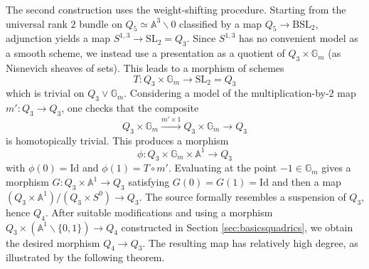 \documentclass[11pt,leqno]{article}
\newcommand{\A}{{\mathbb A}}
\renewcommand{\1}{{\rm 1\hspace*{-0.4ex}%
\rule{0.1ex}{1.52ex}\hspace*{0.2ex}}}
\newcommand{\gm}{{{\mathbb G}_{m}}}
\newcommand{\<}[1]{{\langle}#1 {\rangle}}
\theoremstyle{plain}
\theoremstyle{definition}
\theoremstyle{remark}
\numberwithin{equation}{section}
\begin{document}
The second construction uses the weight-shifting procedure. Starting from the universal rank $2$ bundle on $Q_5\simeq \A^3\smallsetminus{0}$ classified by a map $Q_5\to \mathrm{BSL}_2$, adjunction yields a map $S^{1,3}\to \mathrm{SL}_2=Q_3$. Since $S^{1,3}$ has no convenient model as a smooth scheme, we instead use a presentation as a quotient of $Q_3\times \gm{}$ (as Nisnevich sheaves of sets). This leads to a morphism of schemes
\[
T\colon Q_3\times \gm{}\to \mathrm{SL}_2=Q_3
\]
which is trivial on $Q_3\vee \gm{}$. Considering a model of the multiplication-by-$2$ map $m'\colon Q_3\to Q_3$, one checks that the composite
\[
Q_3\times \gm{}\xrightarrow{m'\times 1}Q_3\times \gm{}\to Q_3
\]
is homotopically trivial. This produces a morphism
\[
\phi\colon Q_3\times \gm{}\times \A^1\to Q_3
\]
with $\phi(0)=\mathrm{Id}$ and $\phi(1)=T\circ m'$. Evaluating at the point $-1\in\gm{}$ gives a morphism $G\colon Q_3\times\A^1\to Q_3$ satisfying $G(0)=G(1)=\mathrm{Id}$ and then a map $(Q_3\times \A^1)/(Q_3\times S^0)\to Q_3$. The source formally resembles a suspension of $Q_3$, hence $Q_4$. After suitable modifications and using a morphism $Q_3\times(\A^1\smallsetminus\{0,1\})\to Q_4$ constructed in Section \ref{sec:basicsquadrics}, we obtain the desired morphism $Q_4\to Q_3$. The resulting map has relatively high degree, as illustrated by the following theorem.
\end{document}
